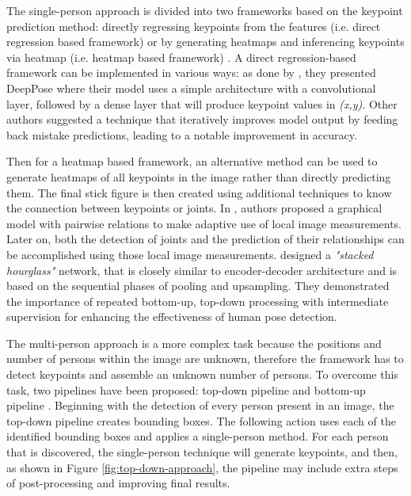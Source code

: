 The single-person approach is divided into two frameworks based on the keypoint prediction method: directly regressing keypoints from the features (i.e. direct regression based framework)
or by generating heatmaps and inferencing keypoints via heatmap (i.e. heatmap based framework) \parencite{romeo}.
A direct regression-based framework can be implemented in various ways: as done by \parencite{toshev2014}, 
they presented DeepPose where their model uses a simple architecture with a convolutional layer, followed by a dense layer that will produce keypoint values in \emph{(x,y)}.
Other authors \parencite{carreira2015} suggested a technique that iteratively improves model output by feeding back mistake predictions, leading to a notable improvement in accuracy.

Then for a heatmap based framework, an alternative method can be used to generate heatmaps of all keypoints in the image
rather than directly predicting them. The final stick figure is then created using additional techniques to know the connection between keypoints or joints.
In \parencite{chen2014}, authors proposed a graphical model with pairwise
relations to make adaptive use of local image measurements. Later on, both the detection of joints and the prediction of their relationships can be accomplished using those local image measurements.
\parencite{newell2016} designed a \emph{"stacked hourglass"} network, that is closely similar to encoder-decoder architecture and is based on the sequential phases of pooling and upsampling.
They demonstrated the importance of repeated bottom-up, top-down processing with intermediate supervision for enhancing the effectiveness of human pose detection.

The multi-person approach is a more complex task because
the positions and number of persons within the image are unknown, therefore the framework has to detect keypoints and assemble an unknown number of persons. To overcome this task,
two pipelines have been proposed: top-down pipeline and bottom-up pipeline \parencite{romeo}.
Beginning with the detection of every person present in an image, the top-down pipeline creates bounding boxes. The following action uses each of the identified bounding boxes and applies a single-person method. 
For each person that is discovered, the single-person technique will generate keypoints, and then, as shown in Figure \ref{fig:top-down-approach}, the pipeline may include extra steps of post-processing and improving final results.

